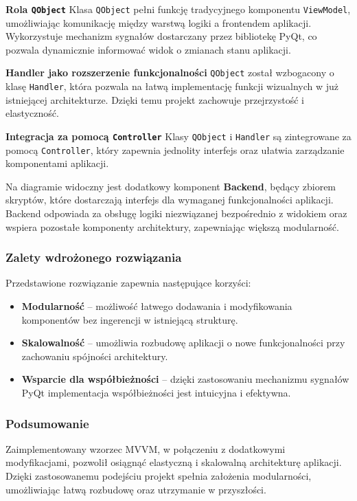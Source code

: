 \textbf{Rola \texttt{QObject}}
Klasa \texttt{QObject} pełni funkcję tradycyjnego komponentu \texttt{ViewModel}, umożliwiając komunikację między warstwą logiki a frontendem aplikacji. Wykorzystuje mechanizm sygnałów dostarczany przez bibliotekę PyQt, co pozwala dynamicznie informować widok o zmianach stanu aplikacji.

\textbf{Handler jako rozszerzenie funkcjonalności}
\texttt{QObject} został wzbogacony o klasę \texttt{Handler}, która pozwala na łatwą implementację funkcji wizualnych w już istniejącej architekturze. Dzięki temu projekt zachowuje przejrzystość i elastyczność.

\textbf{Integracja za pomocą \texttt{Controller}}
Klasy \texttt{QObject} i \texttt{Handler} są zintegrowane za pomocą \texttt{Controller}, który zapewnia jednolity interfejs oraz ułatwia zarządzanie komponentami aplikacji.

Na diagramie widoczny jest dodatkowy komponent \textbf{Backend}, będący zbiorem skryptów, które dostarczają interfejs dla wymaganej funkcjonalności aplikacji. Backend odpowiada za obsługę logiki niezwiązanej bezpośrednio z widokiem oraz wspiera pozostałe komponenty architektury, zapewniając większą modularność.

\subsubsection{Zalety wdrożonego rozwiązania}
Przedstawione rozwiązanie zapewnia następujące korzyści:
\begin{itemize}
    \item \textbf{Modularność} -- możliwość łatwego dodawania i modyfikowania komponentów bez ingerencji w istniejącą strukturę.
    \item \textbf{Skalowalność} -- umożliwia rozbudowę aplikacji o nowe funkcjonalności przy zachowaniu spójności architektury.
    \item \textbf{Wsparcie dla współbieżności} -- dzięki zastosowaniu mechanizmu sygnałów PyQt implementacja współbieżności jest intuicyjna i efektywna.
\end{itemize}

\subsubsection{Podsumowanie}
Zaimplementowany wzorzec MVVM, w połączeniu z dodatkowymi modyfikacjami, pozwolił osiągnąć elastyczną i skalowalną architekturę aplikacji. Dzięki zastosowanemu podejściu projekt spełnia założenia modularności, umożliwiając łatwą rozbudowę oraz utrzymanie w przyszłości.

